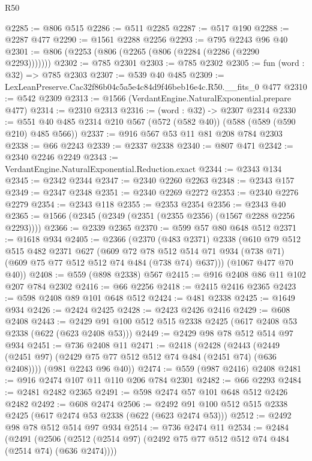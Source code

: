 \begin{lexlean}{R50}
\begin{coremodule}
@2285 := @806 @515
@2286 := @511 @2285
@2287 := @517 @190
@2288 := @2287 @477
@2290 := @1561 @2288 @2256
@2293 := @795 @2243 @96 @40
@2301 := @806 (@2253 (@806 (@2265 (@806 (@2284 (@2286 (@2290 @2293)))))))
@2302 := @785 @2301
@2303 := @785 @2302
@2305 := fun (word : @32) => @785 @2303
@2307 := @539 @40 @485
@2309 := LexLeanPreserve.Cac32f86b04c5a5e4c84d9f46beb16e4c.R50.__fits_0 @477
@2310 := @542 @2309
@2313 := @1566 (VerdantEngine.NaturalExponential.prepare @477)
@2314 := @2310 @2313
@2316 := (word : @32) -> @2307 @2314
@2330 := @551 @40 @485 @2314 @210 @567 (@572 (@582 @40)) (@588 (@589 (@590 @210) @485 @566))
@2337 := @916 @567 @53 @11 @81 @208 @784 @2303
@2338 := @66 @2243
@2339 := @2337 @2338
@2340 := @807 @471
@2342 := @2340 @2246 @2249
@2343 := VerdantEngine.NaturalExponential.Reduction.exact
@2344 := @2343 @134
@2345 := @2342 @2344
@2347 := @2340 @2260 @2263
@2348 := @2343 @157
@2349 := @2347 @2348
@2351 := @2340 @2269 @2272
@2353 := @2340 @2276 @2279
@2354 := @2343 @118
@2355 := @2353 @2354
@2356 := @2343 @40
@2365 := @1566 (@2345 (@2349 (@2351 (@2355 @2356) (@1567 @2288 @2256 @2293))))
@2366 := @2339 @2365
@2370 := @599 @57 @80 @648 @512
@2371 := @1618 @934
@2405 := @2366
    (@2370
      (@483 @2371)
      @2338
      (@610
        @79
        @512
        @515
        @482
        @2371
        @627
        (@609
          @72
          @78
          @512
          @514
          @71
          @934
          (@738 @71)
          (@609 @75 @77 @512 @512 @74 @484 (@738 @74) @637)))
      (@1067 @477 @70 @40))
@2408 := @559 (@898 @2338) @567
@2415 := @916 @2408 @86 @11 @102 @207 @784 @2302
@2416 := @66 @2256
@2418 := @2415 @2416 @2365
@2423 := @598 @2408 @89 @101 @648 @512
@2424 := @481 @2338
@2425 := @1649 @934
@2426 := @2424 @2425
@2428 := @2423 @2426 @2416
@2429 := @608 @2408
@2443 := @2429 @91 @100 @512 @515 @2338 @2425 (@617 @2408 @53 @2338 (@622 (@623 @2408 @53)))
@2449 := @2429 @98 @78 @512 @514 @97 @934
@2451 := @736 @2408 @11
@2471 := @2418
    (@2428
      (@2443 (@2449 (@2451 @97) (@2429 @75 @77 @512 @512 @74 @484 (@2451 @74) (@636 @2408))))
      (@981 @2243 @96 @40))
@2474 := @559 (@987 @2416) @2408
@2481 := @916 @2474 @107 @11 @110 @206 @784 @2301
@2482 := @66 @2293
@2484 := @2481 @2482 @2365
@2491 := @598 @2474 @57 @101 @648 @512 @2426 @2482
@2492 := @608 @2474
@2506 := @2492 @91 @100 @512 @515 @2338 @2425 (@617 @2474 @53 @2338 (@622 (@623 @2474 @53)))
@2512 := @2492 @98 @78 @512 @514 @97 @934
@2514 := @736 @2474 @11
@2534 := @2484
    (@2491
      (@2506 (@2512 (@2514 @97) (@2492 @75 @77 @512 @512 @74 @484 (@2514 @74) (@636 @2474))))

\end{coremodule}
\end{lexlean}
